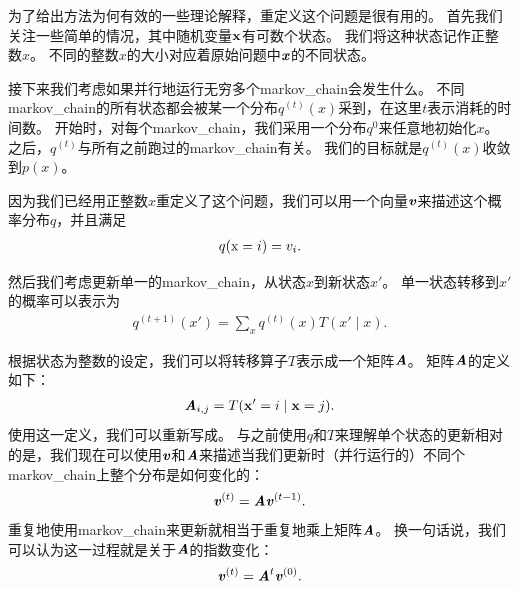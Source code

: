 为了给出方法为何有效的一些理论解释，重定义这个问题是很有用的。
首先我们关注一些简单的情况，其中随机变量$\mathbf{x}$有可数个状态。
我们将这种状态记作正整数$x$。
不同的整数$x$的大小对应着原始问题中$\boldsymbol{\mathit{x}}$的不同状态。


接下来我们考虑如果并行地运行无穷多个\gls{markov_chain}会发生什么。
不同\gls{markov_chain}的所有状态都会被某一个分布$q^{(t)}(x)$采到，在这里$t$表示消耗的时间数。
开始时，对每个\gls{markov_chain}，我们采用一个分布$q^{{0}}$来任意地初始化$x$。
之后，$q^{(t)}$与所有之前跑过的\gls{markov_chain}有关。
我们的目标就是$q^{(t)}(x)$收敛到$p(x)$。


因为我们已经用正整数$x$重定义了这个问题，我们可以用一个向量$\boldsymbol{\mathit{v}}$来描述这个概率分布$q$，并且满足
\begin{align}
q(\mathrm{x} = i) = v_i.
\end{align}


然后我们考虑更新单一的\gls{markov_chain}，从状态$x$到新状态$x'$。
单一状态转移到$x'$的概率可以表示为
\begin{align}
\label{eqn:transition1}
q^{(t+1)}(x') = \sum_{x} q^{(t)}(x) T(x'\mid x).
\end{align}


根据状态为整数的设定，我们可以将转移算子$T$表示成一个矩阵$\boldsymbol{\mathit{A}}$。
矩阵$\boldsymbol{\mathit{A}}$的定义如下：
\begin{align}
\boldsymbol{\mathit{A}}_{i,j} = T(\mathbf{x}' = i\mid \mathbf{x} = j).
\end{align}
使用这一定义，我们可以重新写成。
与之前使用$q$和$T$来理解单个状态的更新相对的是，我们现在可以使用$\boldsymbol{\mathit{v}}$和$\boldsymbol{\mathit{A}}$来描述当我们更新时（并行运行的）不同个\gls{markov_chain}上整个分布是如何变化的：
\begin{align}
\boldsymbol{\mathit{v}}^{(t)} = \boldsymbol{\mathit{A}} \boldsymbol{\mathit{v}}^{(t-1)}.
\end{align}
重复地使用\gls{markov_chain}来更新就相当于重复地乘上矩阵$\boldsymbol{\mathit{A}}$。
换一句话说，我们可以认为这一过程就是关于$\boldsymbol{\mathit{A}}$的指数变化：
\begin{align}
\boldsymbol{\mathit{v}}^{(t)} = \boldsymbol{\mathit{A}}^{t} \boldsymbol{\mathit{v}}^{(0)}.
\end{align}


